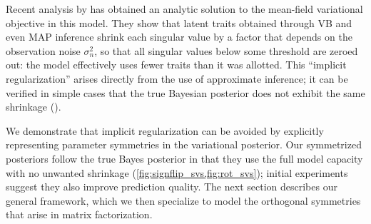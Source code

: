 \documentclass{article}
\renewcommand{\v}[1]{\mathbf{#1}}
\begin{document}

Recent analysis by \citet{nakajima2013global} has obtained an analytic
solution to the mean-field variational objective in this model. They show
that latent traits obtained through VB and even MAP inference shrink each singular value by
a factor that depends on the observation noise $\sigma^2_n$, so that
all singular values below some threshold are zeroed out: the
model effectively uses fewer traits than it was allotted.  This
``implicit regularization'' arises directly from the use of
approximate inference; it can be verified  in simple cases that the
true Bayesian posterior does not exhibit the same shrinkage
(). 

We demonstrate that implicit regularization can be avoided by explicitly representing parameter
symmetries in the variational posterior. Our symmetrized posteriors
follow the true Bayes posterior in that they use the full model capacity with no unwanted shrinkage
(\cref{fig:signflip_svs,fig:rot_svs}); initial experiments suggest they
also improve prediction quality. The next section describes our
general framework, which we then specialize to model the orthogonal symmetries that arise in matrix factorization. 
\end{document}
